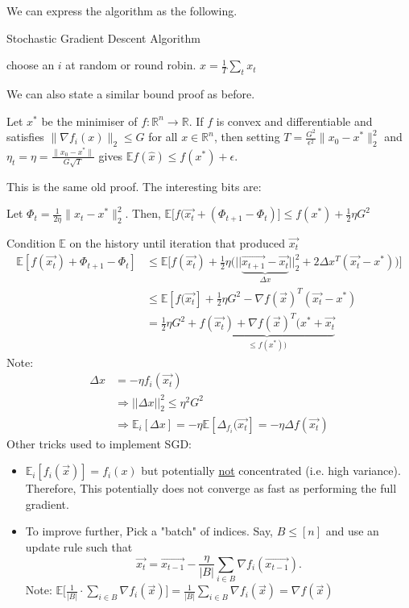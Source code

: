 \documentclass[12pt]{article}
\newcommand{\real}{\mathbb{R}}
\begin{document}
We can express the algorithm as the following.
\begin{algorithm}[H]
	\caption{Stochastic Gradient Descent Algorithm}
	\begin{algorithmic}
		\State choose  an $i$ at random or round robin.
		\EndFor
		\State \Return $\hat{x} = \frac{1}{T} \sum_{t} x_t$
		\EndFunction
	\end{algorithmic}
\end{algorithm}
We can also state a similar bound proof as before.
\begin{theorem}
	\label{sgdthm}
	Let $x^*$ be the minimiser of $f : \real^n \to \real$. If $f$ is convex and differentiable and satisfies $\|\nabla f_i(x)\|_2 \leq G$ for all $x\in\real^n$, then setting $T = \frac{G^2}{\epsilon^2}\|x_0 - x^*\|_2^2$ and $\eta_t = \eta = \frac{\|x_0 - x^*\|}{G\sqrt{T}}$ gives $\mathbb{E}f(\hat{x}) \leq f(x^*) + \epsilon$. 
\end{theorem}
This is the same old proof. The interesting bits are: 
\begin{claim}
	Let $\Phi_t = \frac{1}{2 \eta} \|x_t -x^*\|_2^2$.
	Then, $ \mathbb{E} \bigg [f(\vec{x_t}  + (\Phi_{t+1} - \Phi_t) \bigg ] \leq f(x^*) + \frac{1}{2} \eta G^2 $
\end{claim}
Condition $\mathbb{E}$ on the history until iteration that produced $\vec{x_t}$
\begin{align*}
\mathbb{E} [ f( \vec{x_t})  + \Phi_{t+1} - \Phi_t ] &\leq \mathbb{E} \bigg[f(\vec{x_t}) + \frac{1}{2} \eta  \bigg (|| \underbrace{ \vec{x_{t+1}} - \vec{x_t}}_{ \Delta x } ||_2^2 + 2\Delta x^T(\vec{x_t} -x^*) \bigg ) \bigg ]\\
&\leq \mathbb{E}[f(\vec{x_t}] + \frac{1}{2} \eta  G^2 - \nabla f(\vec{x})^T(\vec{x_t} -x^*) \\
&= \frac{1}{2} \eta  G^2 + \underbrace{f(\vec{x_t}) +\nabla f(\vec{x})^T(x^* +\vec{x_t} }_{\leq f(x^*))}  
\end{align*}
Note: 
\begin{align*}
\Delta x &= -\eta f_i(\vec{x_t})\\
&\Rightarrow || \Delta x||_2^2 \leq \eta^2 G^2\\
&\Rightarrow \mathbb{E}_i[\Delta x] = -\eta \mathbb{E}[\Delta_{f_i}(\vec{ x_t}] = -\eta	\Delta f(\vec{x_t})
\end{align*}
Other tricks used to implement SGD: 
\begin{itemize}
	\item $\mathbb{E}_i [f_i(\vec{x})] = f_i(x) $ but potentially \underline{not} concentrated (i.e. high variance). Therefore, This potentially does not converge as fast as performing the full gradient. 
	\item To improve further, Pick a "batch" of indices. Say, $B \leq [n]$ and use an update rule such that
	$$
	\vec{x_t} = \vec{x_{t-1}} - \frac{\eta}{|B|} \sum_{i \in B} \nabla f_i(\vec{x_{t-1}}).
	$$
	Note: $ \mathbb{E}\bigg[ \frac{1}{|B|}\cdot \sum_{i \in B} \nabla f_i(\vec{x})\bigg] = \frac{1}{|B|}\sum_{i \in B}  \nabla f_i(\vec{x} )=\nabla f(\vec{x} ) $
\end{itemize}
\end{document}
